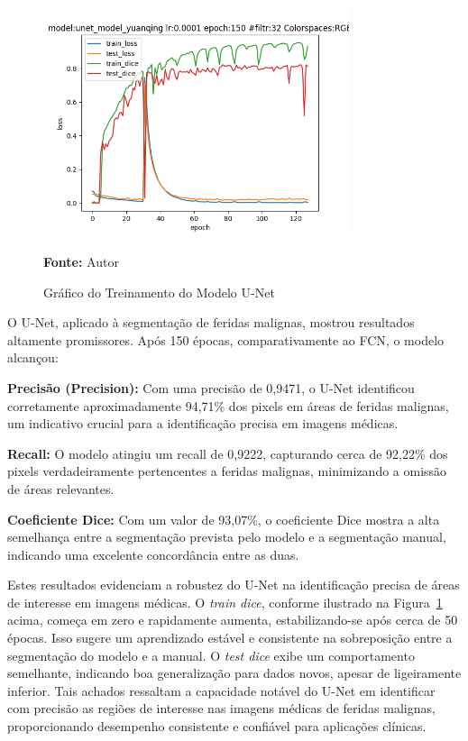 \begin{figure}[htbp]
    \centering
    \caption{Gráfico do Treinamento do Modelo \acf{U-Net}}
    \includegraphics[width=0.8\textwidth]{img/unetprunedmodelfile.png}
    \label{fig:graphU-Net}
    \par\medskip\textbf{Fonte:} Autor
\end{figure}

O \ac{U-Net}, aplicado à segmentação de feridas malignas, mostrou resultados altamente promissores. Após 150 épocas, comparativamente ao \ac{FCN}, o modelo alcançou:

\textbf{Precisão (Precision):} Com uma precisão de 0,9471, o \ac{U-Net} identificou corretamente aproximadamente 94,71\% dos pixels em áreas de feridas malignas, um indicativo crucial para a identificação precisa em imagens médicas.

\textbf{Recall:} O modelo atingiu um recall de 0,9222, capturando cerca de 92,22\% dos pixels verdadeiramente pertencentes a feridas malignas, minimizando a omissão de áreas relevantes.

\textbf{Coeficiente Dice:} Com um valor de 93,07\%, o coeficiente Dice mostra a alta semelhança entre a segmentação prevista pelo modelo e a segmentação manual, indicando uma excelente concordância entre as duas.

Estes resultados evidenciam a robustez do \ac{U-Net} na identificação precisa de áreas de interesse em imagens médicas. O \textit{train dice}, conforme ilustrado na Figura~\ref{fig:graphU-Net} acima, começa em zero e rapidamente aumenta, estabilizando-se após cerca de 50 épocas. Isso sugere um aprendizado estável e consistente na sobreposição entre a segmentação do modelo e a manual. O \textit{test dice} exibe um comportamento semelhante, indicando boa generalização para dados novos, apesar de ligeiramente inferior. Tais achados ressaltam a capacidade notável do \ac{U-Net} em identificar com precisão as regiões de interesse nas imagens médicas de feridas malignas, proporcionando desempenho consistente e confiável para aplicações clínicas.


